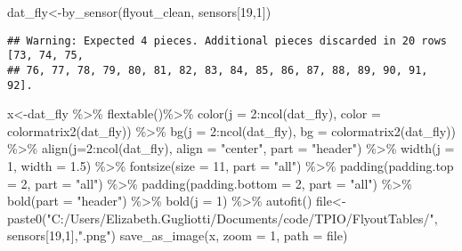 \documentclass[
]{article}
\newenvironment{Shaded}{\begin{snugshade}}{\end{snugshade}}
\newcommand{\AttributeTok}[1]{\textcolor[rgb]{0.77,0.63,0.00}{#1}}
\newcommand{\DecValTok}[1]{\textcolor[rgb]{0.00,0.00,0.81}{#1}}
\newcommand{\FloatTok}[1]{\textcolor[rgb]{0.00,0.00,0.81}{#1}}
\newcommand{\FunctionTok}[1]{\textcolor[rgb]{0.00,0.00,0.00}{#1}}
\newcommand{\NormalTok}[1]{#1}
\newcommand{\OtherTok}[1]{\textcolor[rgb]{0.56,0.35,0.01}{#1}}
\newcommand{\SpecialCharTok}[1]{\textcolor[rgb]{0.00,0.00,0.00}{#1}}
\newcommand{\StringTok}[1]{\textcolor[rgb]{0.31,0.60,0.02}{#1}}
\begin{document}
\begin{Shaded}
\begin{Highlighting}[]
\NormalTok{dat\_fly}\OtherTok{\textless{}{-}}\FunctionTok{by\_sensor}\NormalTok{(flyout\_clean, sensors[}\DecValTok{19}\NormalTok{,}\DecValTok{1}\NormalTok{])}
\end{Highlighting}
\end{Shaded}

\begin{verbatim}
## Warning: Expected 4 pieces. Additional pieces discarded in 20 rows [73, 74, 75,
## 76, 77, 78, 79, 80, 81, 82, 83, 84, 85, 86, 87, 88, 89, 90, 91, 92].
\end{verbatim}

\begin{Shaded}
\begin{Highlighting}[]
\NormalTok{x}\OtherTok{\textless{}{-}}\NormalTok{dat\_fly }\SpecialCharTok{\%\textgreater{}\%}
    \FunctionTok{flextable}\NormalTok{()}\SpecialCharTok{\%\textgreater{}\%}
    \FunctionTok{color}\NormalTok{(}\AttributeTok{j =} \DecValTok{2}\SpecialCharTok{:}\FunctionTok{ncol}\NormalTok{(dat\_fly), }\AttributeTok{color =} \FunctionTok{colormatrix2}\NormalTok{(dat\_fly)) }\SpecialCharTok{\%\textgreater{}\%}
    \FunctionTok{bg}\NormalTok{(}\AttributeTok{j =} \DecValTok{2}\SpecialCharTok{:}\FunctionTok{ncol}\NormalTok{(dat\_fly), }\AttributeTok{bg =} \FunctionTok{colormatrix2}\NormalTok{(dat\_fly)) }\SpecialCharTok{\%\textgreater{}\%}
    \FunctionTok{align}\NormalTok{(}\AttributeTok{j=}\DecValTok{2}\SpecialCharTok{:}\FunctionTok{ncol}\NormalTok{(dat\_fly), }\AttributeTok{align =} \StringTok{"center"}\NormalTok{, }\AttributeTok{part =} \StringTok{"header"}\NormalTok{) }\SpecialCharTok{\%\textgreater{}\%}
    \FunctionTok{width}\NormalTok{(}\AttributeTok{j =} \DecValTok{1}\NormalTok{, }\AttributeTok{width =} \FloatTok{1.5}\NormalTok{) }\SpecialCharTok{\%\textgreater{}\%}    
    \FunctionTok{fontsize}\NormalTok{(}\AttributeTok{size =} \DecValTok{11}\NormalTok{, }\AttributeTok{part =} \StringTok{"all"}\NormalTok{) }\SpecialCharTok{\%\textgreater{}\%}
    \FunctionTok{padding}\NormalTok{(}\AttributeTok{padding.top =} \DecValTok{2}\NormalTok{, }\AttributeTok{part =} \StringTok{"all"}\NormalTok{) }\SpecialCharTok{\%\textgreater{}\%}
    \FunctionTok{padding}\NormalTok{(}\AttributeTok{padding.bottom =} \DecValTok{2}\NormalTok{, }\AttributeTok{part =} \StringTok{"all"}\NormalTok{) }\SpecialCharTok{\%\textgreater{}\%}
    \FunctionTok{bold}\NormalTok{(}\AttributeTok{part =} \StringTok{"header"}\NormalTok{) }\SpecialCharTok{\%\textgreater{}\%}
    \FunctionTok{bold}\NormalTok{(}\AttributeTok{j =} \DecValTok{1}\NormalTok{) }\SpecialCharTok{\%\textgreater{}\%} \FunctionTok{autofit}\NormalTok{()}
\NormalTok{file}\OtherTok{\textless{}{-}}\FunctionTok{paste0}\NormalTok{(}\StringTok{"C:/Users/Elizabeth.Gugliotti/Documents/code/TPIO/FlyoutTables/"}\NormalTok{, sensors[}\DecValTok{19}\NormalTok{,}\DecValTok{1}\NormalTok{],}\StringTok{".png"}\NormalTok{)}
\FunctionTok{save\_as\_image}\NormalTok{(x, }\AttributeTok{zoom =} \DecValTok{1}\NormalTok{, }\AttributeTok{path =}\NormalTok{ file)}
\end{Highlighting}
\end{Shaded}
\end{document}
